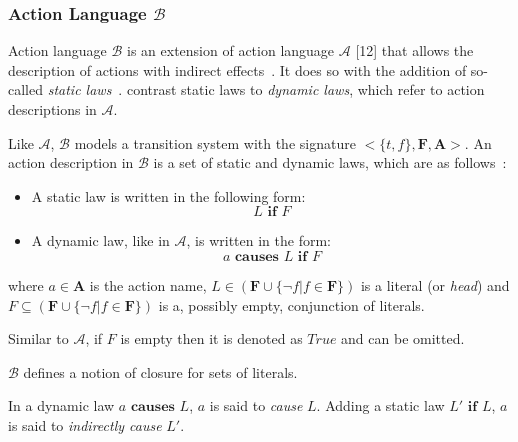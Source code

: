 \subsubsection{Action Language $\mathcal{B}$}
\label{subsubsec:action_language_b}

Action language $\mathcal{B}$ is an extension of action language $\mathcal{A}$ [12] that allows the description of actions with indirect effects~\citep{gelfond_action_1998}.
It does so with the addition of so-called \textit{static laws}~\citep{gelfond_action_1998}.
\citet{gelfond_action_1998} contrast static laws to \textit{dynamic laws}, which refer to action descriptions in $\mathcal{A}$.

Like $\mathcal{A}$, $\mathcal{B}$ models a transition system with the signature $<\{t, f\},\boldsymbol{F},\boldsymbol{A}>$.
An action description in $\mathcal{B}$ is a set of static and dynamic laws, which are as follows~\citep{gelfond_action_1998}:

\begin{itemize}
    \item A static law is written in the following form:
        \begin{equation}
            L \textbf{ if } F
        \end{equation}

    \item A dynamic law, like in $\mathcal{A}$, is written in the form:
        \begin{equation}
            a \textbf{ causes } L \textbf{ if } F
        \end{equation}
\end{itemize}

\noindent
where $a \in \boldsymbol{A}$ is the action name, $L \in(\boldsymbol{F} \cup\{\neg f | f \in \boldsymbol{F}\})$ is a literal (or \textit{head}) and $F \subseteq(\boldsymbol{F} \cup\{\neg f | f \in \boldsymbol{F}\})$ is a, possibly empty, conjunction of literals.

Similar to $\mathcal{A}$, if $F$ is empty then it is denoted as $True$ and can be omitted.

$\mathcal{B}$ defines a notion of closure for sets of literals.

\begin{definition}
    \label{def:causation}
    In a dynamic law $a \textbf{ causes } L$, $a$ is said to \textit{cause} $L$.
    Adding a static law $L' \textbf{ if } L$, $a$ is said to \textit{indirectly cause} $L'$.
\end{definition}

